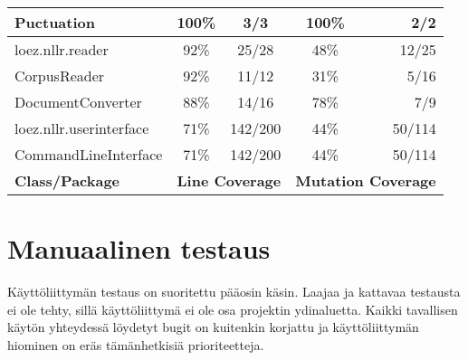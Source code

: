 \documentclass[12pt,a4paper]{article}
\begin{document}
\begin{tabular}{l |c |c |c |r}
\hspace{10 mm}Puctuation & 100\% & 3/3 & 100\% & 2/2 \\
\hline
loez.nllr.reader & 92\% & 25/28 & 48\% & 12/25 \\
\hspace{10 mm}CorpusReader & 92\% & 11/12 & 31\% & 5/16 \\
\hspace{10 mm}DocumentConverter & 88\% & 14/16 & 78\% & 7/9 \\
\hline
loez.nllr.userinterface & 71\% & 142/200 & 44\% & 50/114 \\
\hspace{10 mm}CommandLineInterface & 71\% & 142/200 & 44\% & 50/114 \\
\hline
\textbf{Class/Package}		&	\multicolumn{2}{|c}{\textbf{Line Coverage}} & \multicolumn{2}{|c}{\textbf{Mutation Coverage}} \\
\end{tabular}

\section{Manuaalinen testaus}
Käyttöliittymän testaus on suoritettu pääosin käsin. Laajaa ja kattavaa testausta ei ole tehty, sillä käyttöliittymä ei ole osa projektin ydinaluetta. Kaikki tavallisen käytön yhteydessä löydetyt bugit on kuitenkin korjattu ja käyttöliittymän hiominen on eräs tämänhetkisiä prioriteetteja.
\end{document}
